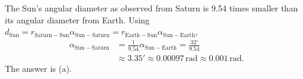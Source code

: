 The Sun's angular diameter as observed from Saturn is 9.54 times smaller
than its angular diameter from Earth.
Using $d_{\mathrm{Sun}}=r_{\mathrm{Saturn-Sun}}\alpha_{\mathrm{Sun-Saturn}}
=r_{\mathrm{Earth-Sun}}\alpha_{\mathrm{Sun-Earth}}$,
\begin{align*}
\alpha_{\mathrm{Sun-Saturn}}
  &=\frac1{9.54}\alpha_{\mathrm{Sun-Earth}}=\frac{32'}{9.54}\\
  &\approx3.35'\approx0.00097\,\mathrm{rad}\approx0.001\,\mathrm{rad}.
\end{align*}
The answer is (a).

